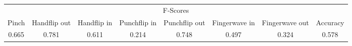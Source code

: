 \documentclass{standalone}
\begin{document}
 
 \begin{tabular}{|c|c|c|c|c|c|c ||c|}
\cline{1-8}\multicolumn{8}{|c|}{F-Scores} \\ 
\cline{1-8}Pinch & Handflip out & Handflip in & Punchflip in & Punchflip out & Fingerwave in & Fingerwave out & Accuracy\\ 
\cline{1-8}0.665 & 0.781 & 0.611 & 0.214 & 0.748 & 0.497 & 0.324 & 0.578\\ 
 \cline{1-8}\hline \end{tabular}
 
\end{document}
